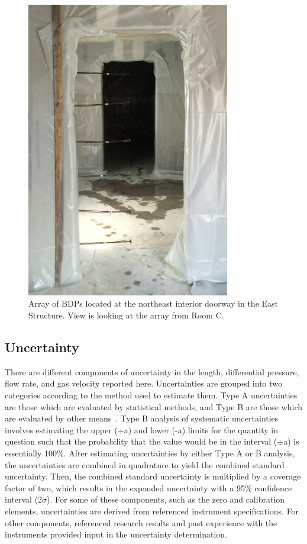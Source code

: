 \documentclass[12pt,oneside]{book}
\begin{document}
\begin{figure}[!ht]
\includegraphics[width=3.5in]{../Pictures/BDPs_east}
\caption[Array of BDPs at interior doorway in East Structure.]{Array of BDPs located at the northeast interior doorway in the East Structure. View is looking at the array from Room C.}
\label{fig:BDPs}
\end{figure}
\FloatBarrier

\subsection{Uncertainty}
\label{subsec:uncertainty}
There are different components of uncertainty in the length, differential pressure, flow rate, and gas velocity reported here. Uncertainties are grouped into two categories according to the method used to estimate them. Type A uncertainties are those which are evaluated by statistical methods, and Type B are those which are evaluated by other means~\cite{Taylor&Kuyatt:1994}. Type B analysis of systematic uncertainties involves estimating the upper (+a) and lower (-a) limits for the quantity in question such that the probability that the value would be in the interval ($\pm$a) is essentially 100\%. After estimating uncertainties by either Type A or B analysis, the uncertainties are combined in quadrature to yield the combined standard uncertainty. Then, the combined standard uncertainty is multiplied by a coverage factor of two, which results in the expanded uncertainty with a 95\% confidence interval (2$\sigma$). For some of these components, such as the zero and calibration elements, uncertainties are derived from referenced instrument specifications. For other components, referenced research results and past experience with the instruments provided input in the uncertainty determination. 
\end{document}
